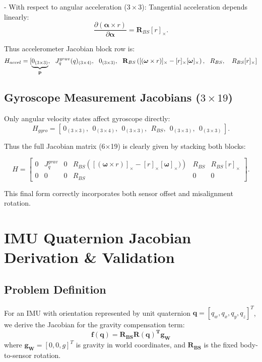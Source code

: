 \documentclass{article}
\begin{document}
	- With respect to angular acceleration ($3\times3$):
	Tangential acceleration depends linearly:
	$$
	\frac{\partial ({\boldsymbol {\alpha}}\times r)} {\partial {\boldsymbol {\alpha}} }=\mathbf R_{BS}[r]_{\times}.
	$$

	Thus accelerometer Jacobian block row is:
	$$
	H_{accel}=
	[\underbrace{{0}_{(3\times 3)}}_{\textbf p},~
	~J_q^{grav}(q)_{(3\times4)},~
	~0_{(3\times 3)},~
	~\mathbf R_{BS}\left([(\boldsymbol{\omega}\times r)]_\times-[r]_\times[\boldsymbol{\omega}]_\times\right),~
	~R_{BS},~~
	~R_{BS}[r]_{\times}]
	$$

	\vspace*{10pt}

	\subsection*{Gyroscope Measurement Jacobians ($3\times19$)}

	Only angular velocity states affect gyroscope directly:
	$$
	H_{gyro}=[\,0_{(3\times 3)},~~0_{(3\times 4)},~~0_{(3\times 3)},~~R_{BS},~~0_{(3\times 3)},~~0_{(3\times 3)}\,].
	$$

	\vspace*{10pt}

	Thus the full Jacobian matrix (6$\times$19) is clearly given by stacking both blocks:

	$$
	H=
	\begin {bmatrix}
	0 & J_q^{grav}& 0 & R_{BS}\left([(\boldsymbol{\omega}\times r)]_\times-[r]_\times[\boldsymbol{\omega}]_\times)\right)& R_{BS}& R_{BS}[r]_{\times}\\[8pt]
	0 & 0 & 0 & R_{BS}& 0 & 0
	\end {bmatrix}.
	$$

	This final form correctly incorporates both sensor offset and misalignment rotation.

\section{IMU Quaternion Jacobian Derivation \& Validation}
\label{sec:theory}

\subsection{Problem Definition}
For an IMU with orientation represented by unit quaternion $\mathbf{q} = [q_w, q_x, q_y, q_z]^T$, we derive the Jacobian for the gravity compensation term:
\begin{equation}
	\mathbf{f(q)} = \mathbf{R_{BS}R(q)^T g_W}
\end{equation}
where $\mathbf{g_W} = [0, 0, g]^T$ is gravity in world coordinates, and $\mathbf{R_{BS}}$ is the fixed body-to-sensor rotation.
\end{document}
